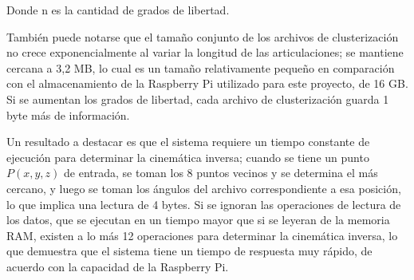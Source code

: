 Donde n es la cantidad de grados de libertad.

También puede notarse que el tamaño conjunto de los archivos de clusterización no crece exponencialmente al variar la longitud de las articulaciones; se mantiene cercana a 3,2 MB, lo cual es un tamaño relativamente pequeño en comparación con el almacenamiento de la Raspberry Pi utilizado para este proyecto, de 16 GB. Si se aumentan los grados de libertad, cada archivo de clusterización guarda 1 byte más de información.

Un resultado a destacar es que el sistema requiere un tiempo constante de ejecución para determinar la cinemática inversa; cuando se tiene un punto $P(x,y,z)$ de entrada, se toman los 8 puntos vecinos y se determina el más cercano, y luego se toman los ángulos del archivo correspondiente a esa posición, lo que implica una lectura de 4 bytes. Si se ignoran las operaciones de lectura de los datos, que se ejecutan en un tiempo mayor que si se leyeran de la memoria RAM, existen a lo más 12 operaciones para determinar la cinemática inversa, lo que demuestra que el sistema tiene un tiempo de respuesta muy rápido, de acuerdo con la capacidad de la Raspberry Pi.